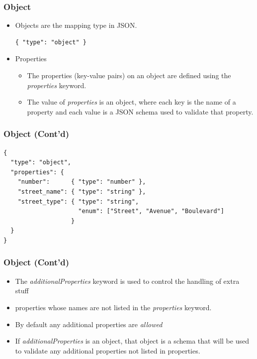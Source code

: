 \documentclass{efd-lecture}
\begin{document}
\begin{frame}[fragile]
  \frametitle{Object}
  \begin{itemize}
    \item Objects are the mapping type in JSON.
    \begin{verbatim}
{ "type": "object" }
    \end{verbatim}
    \item Properties
    \begin{itemize}
      \item
        The properties (key-value pairs) on an object are defined using the
        \textit{\color{YellowOrange}properties} keyword.
      \item
        The value of \textit{\color{YellowOrange}properties} is an object,
        where each key is the name of a property and each value is a JSON
        schema used to validate that property.
    \end{itemize}
  \end{itemize}
\end{frame}

\begin{frame}[fragile]
  \frametitle{Object (Cont'd)}
  \scriptsize
  \begin{verbatim}
{
  "type": "object",
  "properties": {
    "number":      { "type": "number" },
    "street_name": { "type": "string" },
    "street_type": { "type": "string",
                     "enum": ["Street", "Avenue", "Boulevard"]
                   }
  }
}
  \end{verbatim}
\end{frame}

\begin{frame}
  \frametitle{Object (Cont'd)}
  \begin{itemize}
    \item
      The \textit{\color{Purple}additionalProperties} keyword is used
      to control the handling of extra stuff

    \item
      properties whose names are not listed in the
      \textit{\color{YellowOrange}properties} keyword.

    \item
      By default any additional properties are
      \textit{\color{LimeGreen}allowed}

    \item
      If \textit{\color{Purple}additionalProperties} is an object,
      that object is a schema that will be used to validate any additional
      properties not listed in properties.

  \end{itemize}
\end{frame}
\end{document}
